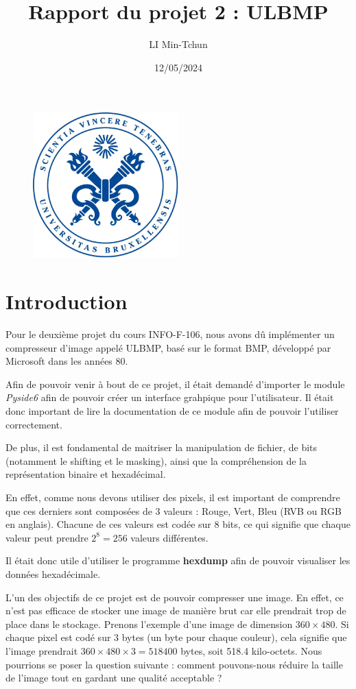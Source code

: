 \documentclass[utf8]{article}
\title{Rapport du projet 2 : ULBMP}
\author{LI Min-Tchun}
\date{12/05/2024}
\begin{document}
\maketitle
\begin{figure}[H]
\centering
\includegraphics[width=0.5\textwidth]{logo.png}
\label{fig:logo}
\end{figure}

\newpage
\tableofcontents
\newpage
\section{Introduction}
Pour le deuxième projet du cours INFO-F-106, nous avons dû implémenter un compresseur d'image appelé ULBMP, basé sur le format BMP, développé par Microsoft dans les années 80.

Afin de pouvoir venir à bout de ce projet, il était demandé d'importer le module \textit{Pyside6} afin de pouvoir créer un interface grahpique pour l'utilisateur. Il était donc important de lire la documentation de ce module afin de pouvoir l'utiliser correctement.

De plus, il est fondamental de maitriser la manipulation de fichier, de bits (notamment le shifting et le masking), ainsi que la compréhension de la représentation binaire et hexadécimal.

En effet, comme nous devons utiliser des pixels, il est important de comprendre que ces derniers sont composées de 3 valeurs : Rouge, Vert, Bleu (RVB ou RGB en anglais). Chacune de ces valeurs est codée sur 8 bits, ce qui signifie que chaque valeur peut prendre $2^8 = 256$ valeurs différentes.


Il était donc utile d'utiliser le programme \textbf{hexdump} afin de pouvoir visualiser les données hexadécimale.

L'un des objectifs de ce projet est de pouvoir compresser une image. En effet, ce n'est pas efficace de stocker une image de manière brut car elle prendrait trop de place dans le stockage. Prenons l'exemple d'une image de dimension $360 \times 480$. Si chaque pixel est codé sur 3 bytes (un byte pour chaque couleur), cela signifie que l'image prendrait $360 \times 480 \times 3 = 518400$ bytes, soit 518.4 kilo-octets. Nous pourrions se poser la question suivante : comment pouvons-nous réduire la taille de l'image tout en gardant une qualité acceptable ?
\end{document}
